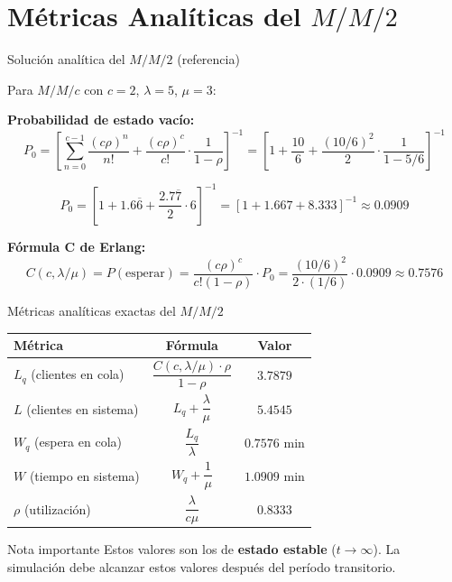 \documentclass[aspectratio=1610, 9pt]{beamer}
\begin{document}
\section{Métricas Analíticas del $M/M/2$}

\begin{frame}{Solución analítica del $M/M/2$ (referencia)}

Para $M/M/c$ con $c=2$, $\lambda=5$, $\mu=3$:

\vspace{0.2cm}
\textbf{Probabilidad de estado vacío:}
\[
P_0 = \left[\sum_{n=0}^{c-1}\frac{(c\rho)^n}{n!} + \frac{(c\rho)^c}{c!}\cdot\frac{1}{1-\rho}\right]^{-1}
= \left[1 + \frac{10}{6} + \frac{(10/6)^2}{2}\cdot\frac{1}{1-5/6}\right]^{-1}
\]

\[
P_0 = \left[1 + 1.6\overline{6} + \frac{2.7\overline{7}}{2}\cdot 6\right]^{-1} = \left[1 + 1.667 + 8.333\right]^{-1} \approx 0.0909
\]

\vspace{0.2cm}
\textbf{Fórmula C de Erlang:}
\[
C(c, \lambda/\mu) = P(\text{esperar}) = \frac{(c\rho)^c}{c!(1-\rho)} \cdot P_0 = \frac{(10/6)^2}{2 \cdot (1/6)} \cdot 0.0909 \approx 0.7576
\]
\end{frame}

\begin{frame}{Métricas analíticas exactas del $M/M/2$}

\begin{center}
\renewcommand{\arraystretch}{1.6}
\begin{tabular}{lcc}
\toprule
\textbf{Métrica} & \textbf{Fórmula} & \textbf{Valor} \\
\midrule
$L_q$ (clientes en cola) & $\dfrac{C(c,\lambda/\mu) \cdot \rho}{1-\rho}$ & $\mathbf{3.7879}$ \\[6pt]
$L$ (clientes en sistema) & $L_q + \dfrac{\lambda}{\mu}$ & $\mathbf{5.4545}$ \\[6pt]
$W_q$ (espera en cola) & $\dfrac{L_q}{\lambda}$ & $\mathbf{0.7576}$ min \\[6pt]
$W$ (tiempo en sistema) & $W_q + \dfrac{1}{\mu}$ & $\mathbf{1.0909}$ min \\[6pt]
$\rho$ (utilización) & $\dfrac{\lambda}{c\mu}$ & $\mathbf{0.8333}$ \\
\bottomrule
\end{tabular}
\end{center}

\vspace{0.3cm}
\begin{alertblock}{Nota importante}
Estos valores son los de \textbf{estado estable} ($t \to \infty$). La simulación debe alcanzar estos valores después del período transitorio.
\end{alertblock}
\end{frame}
\end{document}
